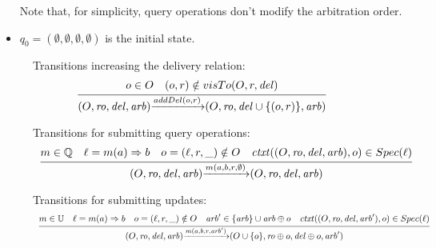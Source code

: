 \begin{itemize}
\begin {itemize}
    \end{itemize}
Note that, for simplicity, query operations don't modify the arbitration order.

\item[-] $q_0=(\emptyset,\emptyset,\emptyset,\emptyset)$ is the initial state.
\end{itemize}

\begin{figure}[ht]
Transitions increasing the delivery relation:
\[
\begin{array}{l c}
\bigfrac{ o \in O\quad (o,r)\notin visTo(O,r,\mathit{del}) }
{ (O,\mathit{ro},\mathit{del},\mathit{arb}) {\xrightarrow{addDel(o,r)}} (O,\mathit{ro},\mathit{del} \cup \{ (o,r) \},\mathit{arb}) } %
\end{array}
\]


Transitions for submitting query operations:
\[
\begin{array}{l c}
\bigfrac{ m \in \mathbb{Q}\quad \ell = m(a) \Rightarrow b\quad o=(\ell,r,\_) \notin O\quad {\mathit{ctxt}}((O,\mathit{ro},\mathit{del},\mathit{arb}),o) \in Spec(\ell) }
{ (O,\mathit{ro},\mathit{del},\mathit{arb}) {\xrightarrow{m(a,b,r,\emptyset)}} (O,\mathit{ro},\mathit{del},\mathit{arb}) } %
\end{array}
\]


Transitions for submitting updates:
\[
\begin{array}{l c}
\bigfrac{ m \in \mathbb{U}\quad \ell = m(a) \Rightarrow b\quad o = (\ell,r,\_) \notin O\quad \mathit{arb}'\in \{\mathit{arb}\}\cup \mathit{arb}\oplus o\quad{\mathit{ctxt}}((O,\mathit{ro},\mathit{del},\mathit{arb}'),o) \in Spec(\ell) }
{ (O,\mathit{ro},\mathit{del},\mathit{arb}) {\xrightarrow{m(a,b,r,\mathit{arb}')}} (O \cup \{ o \},\mathit{ro} \oplus o ,\mathit{del} \oplus o,\mathit{arb}') } %
\end{array}
\]


\end{figure}
